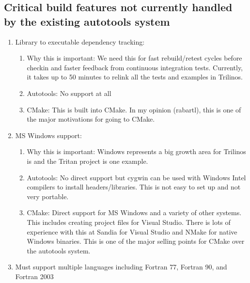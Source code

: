 \documentclass[pdf,ps2pdf,11pt]{SANDreport}
\begin{document}
%
{}\subsection{Critical build features not currently handled by the
existing autotools system}
%

\begin{enumerate}

{}\item Library to executable dependency tracking:

  \begin{enumerate}

  {}\item Why this is important: We need this for fast
  rebuild/retest cycles before checkin and faster feedback from
  continuous integration tests.  Currently, it takes up to 50
  minutes to relink all the tests and examples in Trilinos.

  {}\item Autotools: No support at all

  {}\item CMake: This is built into CMake.  In my opinion (rabartl),
  this is one of the major motivations for going to CMake.

  \end{enumerate}

{}\item MS Windows support:

  \begin{enumerate}

  {}\item Why this is important: Windows represents a big growth
  area for Trilinos is and the Tritan project is one example.

  {}\item Autotools: No direct support but cygwin can be used with
  Windows Intel compilers to install headers/libraries.  This is not
  easy to set up and not very portable.

  {}\item CMake: Direct support for MS Windows and a variety of
  other systems.  This includes creating project files for Visual
  Studio.  There is lots of experience with this at Sandia for
  Visual Studio and NMake for native Windows binaries.  This is one
  of the major selling points for CMake over the autotools system.

  \end{enumerate}

{}\item Must support multiple languages including Fortran 77,
Fortran 90, and Fortran 2003


\end{enumerate}
\end{document}
